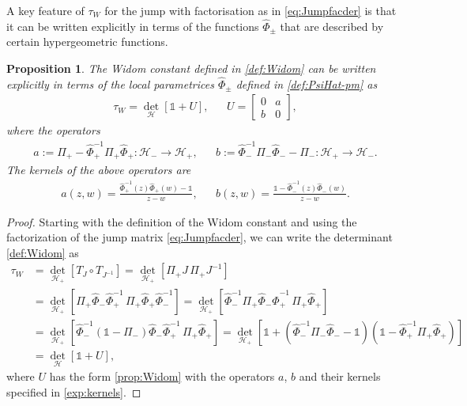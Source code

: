 \documentclass[a4paper,reqno,11pt]{amsart}
\numberwithin{equation}{section}
\numberwithin{figure}{section}
\theoremstyle{plain}
\newtheorem{proposition}[theorem]{Proposition}
\theoremstyle{remark}
\numberwithin{rhp}{section}
\begin{document}
A key feature of $\tau_{W}$ for the jump with factorisation as in \eqref{eq:Jumpfacder} is that it can be written explicitly in terms of the functions $\widehat{\Phi}_{\pm}$ that are described by certain hypergeometric functions. 


\begin{proposition}
The Widom constant defined in \eqref{def:Widom} can be written explicitly in terms of the local parametrices $\widehat{\Phi}_{\pm}$ defined in \eqref{def:PsiHat-pm} as
\begin{align}
    \tau_{W} = \det_{\mathcal{H}}\left[ \mathbb{1} + U\right], && U = \begin{bmatrix}
        0 & a \\
        b & 0
    \end{bmatrix},\label{prop:Widom}
\end{align}
where the operators
\begin{align}
    a:= \Pi_{+}- \widehat{\Phi}_{+}^{-1} \Pi_{+} \widehat{\Phi}_{+}: \mathcal{H}_{-} \rightarrow \mathcal{H}_{+}, && b:= \widehat{\Phi}_{-}^{-1} \Pi_{-} \widehat{\Phi}_{-} - \Pi_{-} : \mathcal{H}_{+} \rightarrow \mathcal{H}_{-}.
\end{align}
The kernels of the above operators are \cite{CGL2017}
\begin{align}\label{exp:kernels}
   a(z,w) = \frac{ \widehat{\Phi}_{+}^{-1}(z)\widehat{\Phi}_{+}(w) -\mathbb{1} }{z-w}, && b(z,w) = \frac{ \mathbb{1}-\widehat{\Phi}_{-}^{-1}(z)\widehat{\Phi}_{-}(w) }{z-w}.
\end{align}
\end{proposition}
\begin{proof}
Starting with the definition of the Widom constant and using the factorization of the jump matrix \eqref{eq:Jumpfacder}, we can write the determinant \eqref{def:Widom} as
\begin{align*}
        \tau_W &= \det_{\mathcal{H}_{+}} \left[T_{J}\circ T_{J^{-1}} \right] \mathop{=}^{}   \det_{\mathcal{H}_{+}} \left[\Pi_{+} J \, \Pi_{+}{J}^{-1} \right] \\
        &\mathop{=} \det_{\mathcal{H}_{+}} \left[\Pi_{+} \widehat{\Phi}_{-}\widehat{\Phi}_{+}^{-1}  \, \Pi_{+} \widehat{\Phi}_{+} \widehat{\Phi}_{-}^{-1}\right] = \det_{\mathcal{H}_{+}} \left[\widehat{\Phi}_{-}^{-1}\Pi_{+} \widehat{\Phi}_{-}\widehat{\Phi}_{+}^{-1}  \, \Pi_{+} \widehat{\Phi}_{+}  \right] \\
        &= \det_{\mathcal{H}_{+}} \left[\widehat{\Phi}_{-}^{-1}\left( \mathbb{1} - \Pi_{-}\right) \widehat{\Phi}_{-}\widehat{\Phi}_{+}^{-1}  \, \Pi_{+} \widehat{\Phi}_{+}  \right]  = \det_{\mathcal{H}_{+}} \left[\mathbb{1} + \left( \widehat{\Phi}_{-}^{-1} \Pi_{-} \widehat{\Phi}_{-} - \mathbb{1}\right)\left(\mathbb{1} - \widehat{\Phi}_{+}^{-1} \Pi_{+} \widehat{\Phi}_{+}\right)  \right] \\
        & = \det_{\mathcal{H}}\left[\mathbb{1}+ U \right],
    \end{align*}
    where $U$ has the form \eqref{prop:Widom} with the operators $a$, $b$ and their kernels specified in \eqref{exp:kernels}.
\end{proof}
\end{document}
